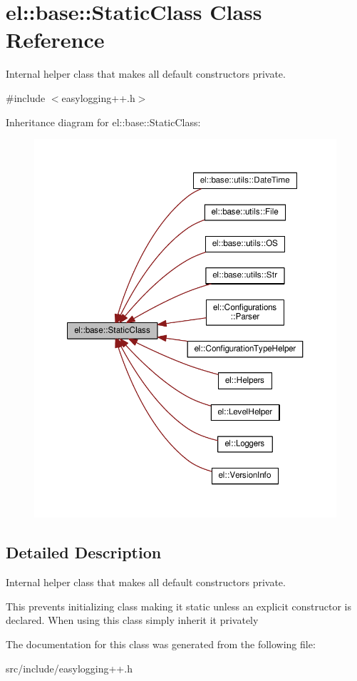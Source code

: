 \hypertarget{classel_1_1base_1_1_static_class}{}\section{el\+:\+:base\+:\+:Static\+Class Class Reference}
\label{classel_1_1base_1_1_static_class}


Internal helper class that makes all default constructors private.  




{\ttfamily \#include $<$easylogging++.\+h$>$}



Inheritance diagram for el\+:\+:base\+:\+:Static\+Class\+:
\nopagebreak
\begin{figure}[H]
\begin{center}
\leavevmode
\includegraphics[width=350pt]{classel_1_1base_1_1_static_class__inherit__graph}
\end{center}
\end{figure}


\subsection{Detailed Description}
Internal helper class that makes all default constructors private. 

This prevents initializing class making it static unless an explicit constructor is declared. When using this class simply inherit it privately 

The documentation for this class was generated from the following file\+:\begin{DoxyCompactItemize}
\item 
src/include/easylogging++.\+h\end{DoxyCompactItemize}
